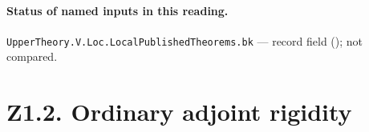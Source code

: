 
\paragraph{Status of named inputs in this reading.}
\noindent\nolinkurl{UpperTheory.V.Loc.LocalPublishedTheorems.bk} --- record field (); not compared.\par

\section*{Z1.2. Ordinary adjoint rigidity}

